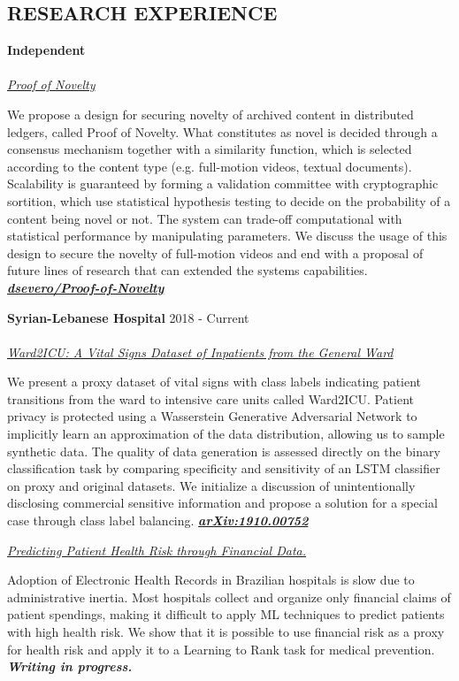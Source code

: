 \documentclass[margin, line]{res}
\begin{document}
\begin{resume}
\section{RESEARCH EXPERIENCE}
\textbf{Independent}\\
\\
\underline{\sl Proof of Novelty}\\
\begin{small}
    We propose a design for securing novelty of archived content in distributed ledgers, called Proof of Novelty. What constitutes as novel is decided through a consensus mechanism together with a similarity function, which is selected according to the content type (e.g. full-motion videos, textual documents). Scalability is guaranteed by forming a validation committee with cryptographic sortition, which use statistical hypothesis testing to decide on the probability of a content being novel or not. The system can trade-off computational with statistical performance by manipulating parameters. We discuss the usage of this design to secure the novelty of full-motion videos and end with a proposal of future lines of research that can extended the systems capabilities. \href{https://github.com/dsevero/Proof-of-Novelty}{\sl \textbf{dsevero/Proof-of-Novelty}}
\end{small}

\textbf{Syrian-Lebanese Hospital} \hfill 2018 - Current\\
\\
\underline{\sl Ward2ICU: A Vital Signs Dataset of Inpatients from the General Ward}\\
\begin{small}
    We present a proxy dataset of vital signs with class labels indicating patient transitions from the ward to intensive care units called Ward2ICU. Patient privacy is protected using a Wasserstein Generative Adversarial Network to implicitly learn an approximation of the data distribution, allowing us to sample synthetic data. The quality of data generation is assessed directly on the binary classification task by comparing specificity and sensitivity of an LSTM classifier on proxy and original datasets. We initialize a discussion of unintentionally disclosing commercial sensitive information and propose a solution for a special case through class label balancing. \href{https://arxiv.org/abs/1910.00752}{\sl \textbf{arXiv:1910.00752}}
\end{small}
\newpage
\underline{\sl Predicting Patient Health Risk through Financial Data.}\\
\begin{small}
    Adoption of Electronic Health Records in Brazilian hospitals is slow due to administrative inertia. Most hospitals collect and organize only financial claims of patient spendings, making it difficult to apply ML techniques to predict patients with high health risk. We show that it is possible to use financial risk as a proxy for health risk and apply it to a Learning to Rank task for medical prevention. {\sl \textbf{Writing in progress.}}
\end{small}


\end{resume}
\end{document}
